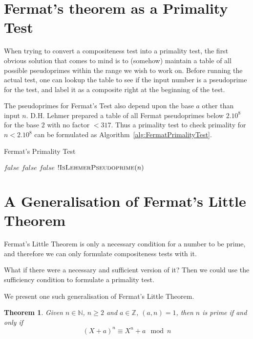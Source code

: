 \documentclass[11pt]{article}
\newtheorem{theorem}{Theorem}[section]
\begin{document}
\section{Fermat's theorem as a Primality Test}
When trying to convert a compositeness test into a primality test, the first obvious solution that comes to mind is to (somehow) maintain a table of all possible pseudoprimes within the range we wish to work on. Before running the actual test, one can lookup the table to see if the input number is a pseudoprime for the test, and label it as a composite right at the beginning of the test.

The pseudoprimes for Fermat's Test also depend upon the base $a$ other than input $n$. D.H. Lehmer prepared a table of all Fermat pseudoprimes below $2.10^8$ for the base $2$ with no factor $< 317$. Thus a primality test to check primality for $n < 2.10^8$ can be formulated as Algorithm~\ref{alg:FermatPrimalityTest}.

\begin{algorithm}
\caption{Fermat's Primality Test}
\label{alg:FermatPrimalityTest}
\begin{algorithmic}
	\State \Return $false$ 
\EndIf
{}
		\State \Return $false$ 
	\EndIf
\EndFor
{}
	\State \Return $false$ 
\EndIf
\State \Return $!\Call{IsLehmerPseudoprime}{n}$ 
\EndProcedure
\end{algorithmic}
\end{algorithm}

\section{A Generalisation of Fermat's Little Theorem}
Fermat's Little Theorem is only a necessary condition for a number to be prime, and therefore we can only formulate compositeness tests with it.

What if there were a necessary and sufficient version of it? Then we could use the sufficiency condition to formulate a primality test.

We present one such generalisation of Fermat's Little Theorem.

\begin{theorem}
\label{theorem:GeneralisedFermatLittleTheorem}
Given $n \in \mathbb{N}$, $n \geq 2$ and $a \in \mathbb{Z}$, $(a,n) = 1$, then $n$ is prime if and only if
\[ (X+a)^n \equiv X^n + a \mod n \]
\end{theorem}
\end{document}

